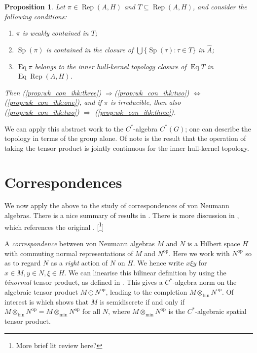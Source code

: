 \documentclass[a4paper,11pt]{article}
\newcommand{\Rep}{\operatorname{Rep}}
\newcommand{\Eq}{\operatorname{Eq}}
\newcommand{\Sp}{\operatorname{Sp}}
\newcommand{\op}{{\operatorname{op}}}
\newcommand{\bin}{{\operatorname{bin}}}
\newtheorem{proposition}[lemma]{Proposition}
\begin{document}
\begin{proposition}
Let $\pi\in\Rep(A,H)$ and $T\subseteq\Rep(A,H)$, and consider the following
conditions:
\begin{enumerate}
\item\label{prop:wk_con_ihk:one} $\pi$ is weakly contained in $T$;
\item\label{prop:wk_con_ihk:two} $\Sp(\pi)$ is contained in the closure of
$\bigcup\{\Sp(\tau) : \tau\in T\}$ in $\hat A$;
\item\label{prop:wk_con_ihk:three} $\Eq\pi$ belongs to the inner hull-kernel
topology closure of $\Eq T$ in $\Eq\Rep(A,H)$.
\end{enumerate}
Then (\ref{prop:wk_con_ihk:three}) $\Rightarrow $(\ref{prop:wk_con_ihk:two})
$\Leftrightarrow$ (\ref{prop:wk_con_ihk:one}), and if $\pi$ is irreducible,
then also (\ref{prop:wk_con_ihk:two}) $\Rightarrow$
(\ref{prop:wk_con_ihk:three}).
\end{proposition}

We can apply this abstract work to the $C^*$-algebra $C^*(G)$; one can
describe the topology in terms of the group alone.  Of note is the result
that the operation of taking the tensor product is jointly continuous for
the inner hull-kernel topology.


\section{Correspondences}

We now apply the above to the study of correspondences of von Neumann algebras.
There is a nice summary of results in \cite[page~316]{ad1}.  There is more
discussion in \cite[Section~1.12]{ad2}, which references the original \cite{cj}.
[\footnote{More brief lit review here?}]

A \emph{correspondence} between von Neumann algebras $M$ and $N$ is a Hilbert
space $H$ with commuting normal representations of $M$ and $N^\op$.  Here we
work with $N^\op$ so as to regard $N$ as a \emph{right} action of $N$ on $H$.
We hence write $x\xi y$ for $x\in M, y\in N, \xi\in H$.
We can linearise this bilinear definition by using the \emph{binormal}
tensor product, as defined in \cite{el}.  This gives a $C^*$-algebra norm on
the algebraic tensor product $M\odot N^\op$, leading to the completion
$M\otimes_{\bin}N^\op$.  Of interest is \cite[Theorem~4.1]{el} which shows
that $M$ is semidiscrete if and only if $M\otimes_\bin N^\op = M\otimes_{\min}
N^\op$ for all $N$, where $M\otimes_{\min} N^\op$ is the $C^*$-algebraic
spatial tensor product.
\end{document}
